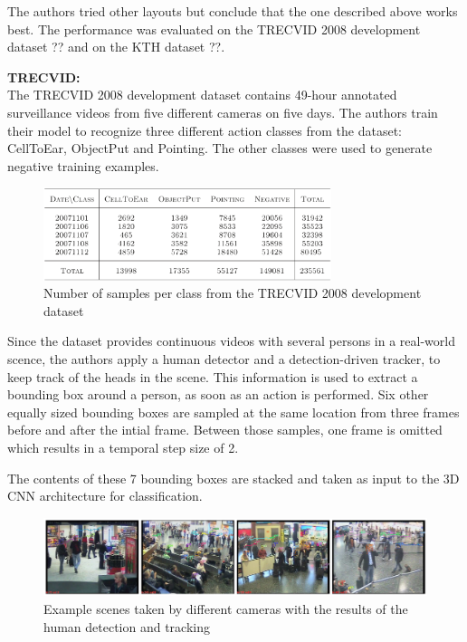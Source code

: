 The authors tried other layouts but conclude that the one described above works best. The performance was evaluated on the TRECVID 2008 development dataset ?? and on the KTH dataset ??.

\textbf{TRECVID:}\\
The TRECVID 2008 development dataset contains 49-hour annotated surveillance videos from five different cameras on five days.
The authors train their model to recognize three different action classes from the dataset: CellToEar, ObjectPut and Pointing.
The other classes were used to generate negative training examples.

\begin{figure}[H]
    \centering
    \includegraphics[width=0.75\textwidth]{img_deep/3dconv_dataset}
    \caption{Number of samples per class from the TRECVID 2008 development dataset \cite{ji_3d_2013}}
    \label{fig:3dconv_dataset}
\end{figure}

Since the dataset provides continuous videos with several persons in a real-world scence, the authors apply a human detector and a detection-driven tracker, to keep track of the heads in the scene.
This information is used to extract a bounding box around a person, as soon as an action is performed. 
Six other equally sized bounding boxes are sampled at the same location from three frames before and after the intial frame.
Between those samples, one frame is omitted which results in a temporal step size of 2.

The contents of these 7 bounding boxes are stacked and taken as input to the 3D CNN architecture for classification.

\begin{figure}[H]
    \centering
    \includegraphics[width=\textwidth]{img_deep/3dconv_sampletracking}
    \caption{Example scenes taken by different cameras with the results of the human detection and tracking \cite{ji_3d_2013}}
    \label{fig:3dconv_sampletracking}
\end{figure}

